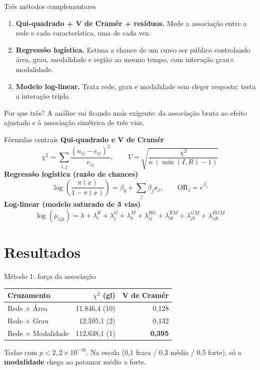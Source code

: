 \documentclass{beamer}
\begin{document}
\begin{frame}{Três métodos complementares}
  \begin{enumerate}
    \item \textbf{Qui-quadrado + V de Cramér + resíduos.} Mede a associação entre a rede e cada característica, uma de cada vez.
    \item \textbf{Regressão logística.} Estima a chance de um curso ser público controlando área, grau, modalidade e região ao mesmo tempo, com interação grau$\times$modalidade.
    \item \textbf{Modelo log-linear.} Trata rede, grau e modalidade sem eleger resposta; testa a interação tripla.
  \end{enumerate}
  \begin{block}{Por que três?}
    A análise vai ficando mais exigente: da associação bruta ao efeito ajustado e à associação simétrica de três vias.
  \end{block}
\end{frame}

\begin{frame}{Fórmulas centrais}
  \textbf{Qui-quadrado e V de Cramér}
  \[
    \chi^2 = \sum_{i,j} \frac{(n_{ij}-e_{ij})^2}{e_{ij}},
    \qquad
    V = \sqrt{\frac{\chi^2}{n\,(\min(I,R)-1)}}
  \]
  \textbf{Regressão logística (razão de chances)}
  \[
    \log\!\left(\frac{\pi(x)}{1-\pi(x)}\right) = \beta_0 + \sum_j \beta_j x_j,
    \qquad
    \text{OR}_j = e^{\beta_j}
  \]
  \textbf{Log-linear (modelo saturado de 3 vias)}
  \[
    \log(\mu_{ijk}) = \lambda + \lambda_i^{R} + \lambda_j^{G} + \lambda_k^{M} + \lambda_{ij}^{RG} + \lambda_{ik}^{RM} + \lambda_{jk}^{GM} + \lambda_{ijk}^{RGM}
  \]
\end{frame}

\section{Resultados}

\begin{frame}{Método 1: força da associação}
  \begin{table}
    \centering
    \small
    \begin{tabular}{lrr}
      \toprule
      Cruzamento & $\chi^2$ (gl) & V de Cramér \\
      \midrule
      Rede $\times$ Área      & 11.846,4 (10) & 0,128 \\
      Rede $\times$ Grau      & 12.595,1 (2)  & 0,132 \\
      Rede $\times$ Modalidade & 112.638,1 (1) & \textbf{0,395} \\
      \bottomrule
    \end{tabular}
  \end{table}
  Todas com $p<2{,}2\times10^{-16}$. Na escala (0,1 fraca / 0,3 média / 0,5 forte), só a \textbf{modalidade} chega ao patamar médio a forte.
\end{frame}
\end{document}
